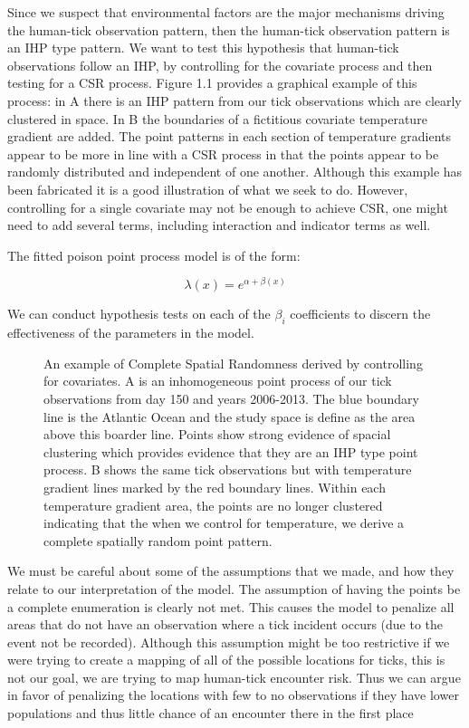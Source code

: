 \noindent Since we suspect that environmental factors are the major mechanisms driving the human-tick observation pattern, then the human-tick observation pattern is an IHP type pattern. We want to test this hypothesis that human-tick observations follow an IHP, by controlling for the covariate process and then testing for a CSR process. Figure 1.1 provides a graphical example of this process: in A there is an IHP pattern from our tick observations which are clearly clustered in space. In B the boundaries of a fictitious covariate temperature gradient are added. The point patterns in each section of temperature gradients appear to be more in line with a CSR process in that the points appear to be randomly distributed and independent of one another. Although this example has been fabricated it is a good illustration of what we seek to do. However, controlling for a single covariate may not be enough to achieve CSR, one might need to add several terms, including interaction and indicator terms as well.\newline
 
 
\noindent The fitted poison point process model is of the form:

\begin{equation}
\lambda(x) = e^{\alpha +\beta(x)}
\end{equation}

\noindent We can conduct hypothesis tests on each of the $\beta_i$ coefficients to discern the effectiveness of the parameters in the model. \newline


\begin{figure} [t]
\centerline{}
\caption{An example of Complete Spatial Randomness derived by controlling for covariates. A is an inhomogeneous point process of our tick observations from day 150 and years 2006-2013. The blue boundary line is the Atlantic Ocean and the study space is define as the area above this boarder line. Points show strong evidence of spacial clustering which provides evidence that they are an IHP type point process. B shows the same tick observations but with temperature gradient lines marked by the red boundary lines. Within each temperature gradient area, the points are no longer clustered indicating that the when we control for temperature, we derive a complete spatially random point pattern.  }
\label{fig6}
\end{figure}

\noindent We must be careful about some of the assumptions that we made, and how they relate to our interpretation of the model. The assumption of having the points be a complete enumeration is clearly not met. This causes the model to penalize all areas that do not have an observation where a tick incident occurs (due to the event not be recorded). Although this assumption might be too restrictive if we were trying to create a mapping of all of the possible locations for ticks, this is not our goal, we are trying to map human-tick encounter risk. Thus we can argue in favor of penalizing the locations with few to no observations if they have lower populations and thus little chance of an encounter there in the first place\newline


